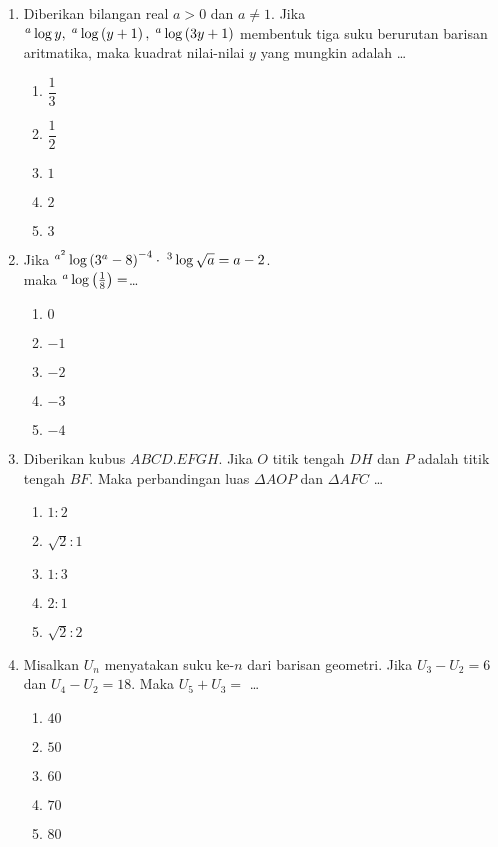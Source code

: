 \documentclass[A4,12PT, english, twocolumn]{journal}
\begin{document}
\begin{enumerate}
\item Diberikan bilangan real $a>0$ dan $a \neq 1$. Jika $^a\Log y, \; ^a\Log \left(y+1 \right), \; ^a\Log \left(3y+1 \right)$ membentuk tiga suku berurutan barisan aritmatika, maka kuadrat nilai-nilai $y$ yang mungkin adalah \dots
    \begin{enumerate}
        \item $\dfrac{1}{3}$
        \item $\dfrac{1}{2}$
        \item $1$
        \item $2$
        \item $3$
    \end{enumerate}
    
\item Jika $^{a^2} \Log \left( 3^a-8 \right)^{-4} \cdot \; ^{3} \Log \sqrt{a} = a-2$. \\ maka $^a \Log \left( \frac{1}{8} \right) = $\dots
	\begin{enumerate}
		\item $0$
		\item $-1$
		\item $-2$
		\item $-3$
		\item $-4$
	\end{enumerate}
	
\item Diberikan kubus $ABCD.EFGH$. Jika $O$ titik tengah $DH$ dan $P$ adalah titik tengah $BF$. Maka perbandingan luas $\Delta AOP$ dan $\Delta AFC$ \dots
   \begin{enumerate}
        \item $1:2$
        \item $\sqrt{2}:1$
        \item $1:3$
        \item $2:1$
        \item $\sqrt{2}:2$
   \end{enumerate}
   
\item Misalkan $U_n$ menyatakan suku ke-$n$ dari barisan geometri. Jika $U_3-U_2 = 6$ dan $U_4-U_2 = 18$. Maka $U_5+U_3=$ \dots
    \begin{enumerate}
        \item $40$
        \item $50$
        \item $60$
        \item $70$
        \item $80$
    \end{enumerate}
  

\end{enumerate}
\end{document}
